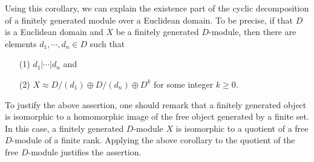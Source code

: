 \begin{rmk}
    Using this corollary, we can explain the existence part of the cyclic decomposition of a finitely generated module over a Euclidean domain.
    To be precise, if that $D$ is a Euclidean domain and $X$ be a finitely generated $D$-module, then there are elements $d_1, \cdots, d_n\in D$ such that
    \begin{enumerate}
        \item[(1)]
        {
            $d_1|\cdots|d_n$ and
        }
        \item[(2)]
        {
            $X\approx D/(d_1)\oplus D/(d_n)\oplus D^k$ for some integer $k\geq 0$.
        }
    \end{enumerate}
    
    To justify the above assertion, one should remark that a finitely generated object is isomorphic to a homomorphic image of the free object generated by a finite set.
    In this case, a finitely generated $D$-module $X$ is isomorphic to a quotient of a free $D$-module of a finite rank.
    Applying the above corollary to the quotient of the free $D$-module justifies the assertion.
\end{rmk}

